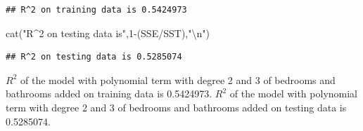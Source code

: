 \documentclass[
]{article}
\newenvironment{Shaded}{\begin{snugshade}}{\end{snugshade}}
\newcommand{\CommentTok}[1]{\textcolor[rgb]{0.56,0.35,0.01}{\textit{#1}}}
\newcommand{\DecValTok}[1]{\textcolor[rgb]{0.00,0.00,0.81}{#1}}
\newcommand{\FunctionTok}[1]{\textcolor[rgb]{0.00,0.00,0.00}{#1}}
\newcommand{\NormalTok}[1]{#1}
\newcommand{\OtherTok}[1]{\textcolor[rgb]{0.56,0.35,0.01}{#1}}
\newcommand{\SpecialCharTok}[1]{\textcolor[rgb]{0.00,0.00,0.00}{#1}}
\newcommand{\StringTok}[1]{\textcolor[rgb]{0.31,0.60,0.02}{#1}}
\begin{document}
\begin{Shaded}
\end{Shaded}

\begin{verbatim}
## R^2 on training data is 0.5424973
\end{verbatim}

\begin{Shaded}
\begin{Highlighting}[]
\FunctionTok{cat}\NormalTok{(}\StringTok{"R\^{}2 on testing data is"}\NormalTok{,}\DecValTok{1}\SpecialCharTok{{-}}\NormalTok{(SSE}\SpecialCharTok{/}\NormalTok{SST),}\StringTok{"}\SpecialCharTok{\textbackslash{}n}\StringTok{"}\NormalTok{)}
\end{Highlighting}
\end{Shaded}

\begin{verbatim}
## R^2 on testing data is 0.5285074
\end{verbatim}

\(R^2\) of the model with polynomial term with degree 2 and 3 of
bedrooms and bathrooms added on training data is 0.5424973. \(R^2\) of
the model with polynomial term with degree 2 and 3 of bedrooms and
bathrooms added on testing data is 0.5285074.
\end{document}
